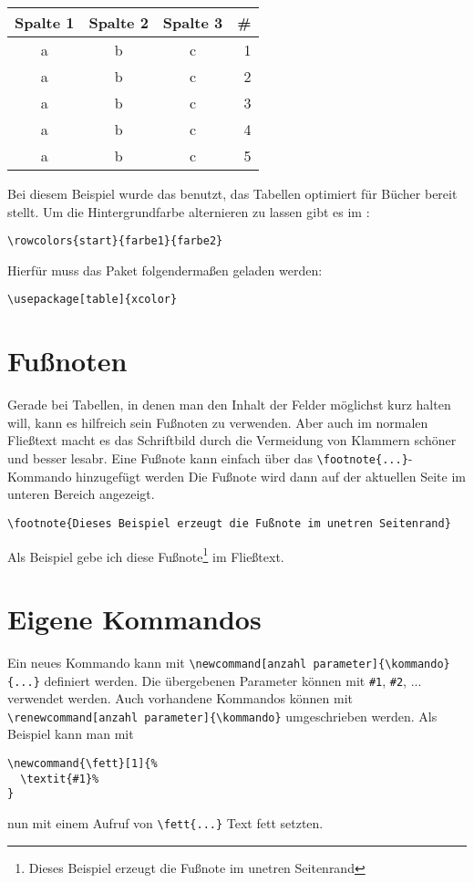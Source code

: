 \begin{center}
  {
    \begin{tabular}{c c c r}\\\toprule
      Spalte 1 & Spalte 2 & Spalte 3 & \# \\\midrule
      a & b & c & 1\\
      a & b & c & 2\\
      a & b & c & 3\\
      a & b & c & 4\\
      a & b & c & 5\\\bottomrule
    \end{tabular}
  }
\end{center}

Bei diesem Beispiel wurde das  benutzt, das Tabellen optimiert für Bücher bereit stellt. Um
die Hintergrundfarbe alternieren zu lassen gibt es im :
\begin{verbatim}
\rowcolors{start}{farbe1}{farbe2}
\end{verbatim}
 Hierfür muss das Paket folgendermaßen geladen werden:
\begin{verbatim}
\usepackage[table]{xcolor}
\end{verbatim}

\section{Fußnoten}
Gerade bei Tabellen, in denen man den Inhalt der Felder möglichst kurz halten will, kann es hilfreich sein
Fußnoten zu verwenden. Aber auch im normalen Fließtext macht es das Schriftbild durch die Vermeidung von Klammern
schöner und besser lesabr. Eine Fußnote kann einfach über das \verb+\footnote{...}+-Kommando hinzugefügt werden
Die Fußnote wird dann auf der aktuellen Seite im unteren Bereich angezeigt.
\begin{verbatim}
\footnote{Dieses Beispiel erzeugt die Fußnote im unetren Seitenrand}
\end{verbatim}
Als Beispiel gebe ich diese Fußnote\footnote{Dieses Beispiel erzeugt die Fußnote im unetren Seitenrand} im
Fließtext.

\section{Eigene Kommandos}\label{sec:customCommands}
Ein neues Kommando kann mit \verb+\newcommand[anzahl parameter]{\kommando}{...}+ definiert werden.
Die übergebenen Parameter können mit \verb+#1+, \verb+#2+, ... verwendet werden. Auch vorhandene Kommandos
können mit \verb+\renewcommand[anzahl parameter]{\kommando}+ umgeschrieben werden. Als Beispiel kann man mit
\begin{verbatim}
\newcommand{\fett}[1]{%
  \textit{#1}%
}
\end{verbatim}
nun mit einem Aufruf von \verb+\fett{...}+ Text fett setzten.


